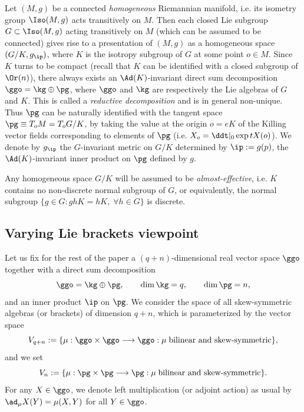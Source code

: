 \documentclass[11pt]{amsart}
\theoremstyle{plain}
\theoremstyle{definition}
\theoremstyle{remark}
\begin{document}
Let $(M,g)$ be a connected {\it homogeneous} Riemannian manifold, i.e. its isometry group $\Iso(M,g)$ acts transitively on $M$.  Then each closed Lie subgroup $G\subset\Iso(M,g)$ acting transitively on $M$ (which can be assumed to be connected) gives rise to a
presentation of $(M,g)$ as a homogeneous space $(G/K,g_{\ip})$, where
$K$ is the isotropy subgroup of $G$ at some point $o\in M$.  Since $K$ turns to be compact (recall that $K$ can be identified with a closed subgroup of $\Or(n)$), there always
exists an $\Ad(K)$-invariant direct sum decomposition $\ggo=\kg\oplus\pg$, where $\ggo$ and $\kg$ are respectively the Lie algebras of $G$ and $K$.  This is called a {\it reductive decomposition} and is in general non-unique.  Thus $\pg$ can be naturally identified with the tangent space $\pg\equiv T_oM=T_oG/K$, by taking the value at the origin $o=eK$ of the Killing vector fields
corresponding to elements of $\pg$ (i.e. $X_o=\ddt|_0\exp{tX}(o)$).  We denote by $g_{\ip}$ the $G$-invariant metric on $G/K$ determined by $\ip:=g(p)$, the $\Ad(K)$-invariant inner product on $\pg$ defined by $g$.

Any homogeneous space $G/K$ will be assumed to be {\it almost-effective}, i.e. $K$ contains no non-discrete normal subgroup of
$G$, or equivalently, the normal subgroup $\{ g\in G:ghK=hK, \;\forall h\in G\}$ is discrete.





\subsection{Varying Lie brackets viewpoint}\label{varhs}
Let us fix for the rest of the paper a $(q+n)$-dimensional real vector space $\ggo$ together with a direct sum decomposition
\begin{equation}\label{fixdec}
\ggo=\kg\oplus\pg, \qquad \dim{\kg}=q, \qquad \dim{\pg=n},
\end{equation}
and an inner product $\ip$ on $\pg$.  We consider the space of all skew-symmetric algebras (or brackets) of dimension $q+n$, which is
parameterized by the vector space
$$
V_{q+n}:=\{\mu:\ggo\times\ggo\longrightarrow\ggo : \mu\; \mbox{bilinear and
skew-symmetric}\},
$$
and we set
$$
V_{n}:=\{\mu:\pg\times\pg\longrightarrow\pg : \mu\; \mbox{bilinear and
skew-symmetric}\}.
$$
For any $X\in\ggo$, we denote left multiplication (or adjoint action) as usual by $\ad_{\mu}{X}(Y)=\mu(X,Y)$ for all $Y\in\ggo$.
\end{document}
